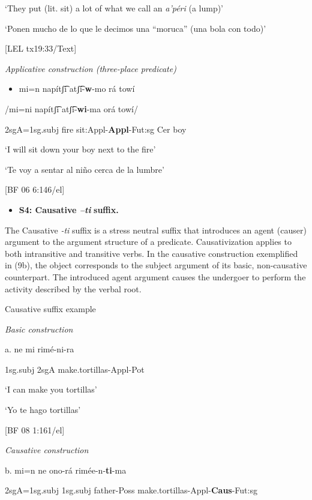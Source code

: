     ‘They put (lit. sit) a lot of what we call an \textit{a’péri}  (a lump)’

‘Ponen mucho de lo que le decimos una “moruca” (una bola con todo)’

  [LEL tx19:33/Text]

  \textit{Applicative construction (three-place predicate)}


\begin{itemize}
\item    mi=n     napítʃ͡i   atʃ͡í-\textbf{w}{}-mo     rá   towí
\end{itemize}

/mi=ni    napítʃ͡i   atʃ͡í-\textbf{wi}{}-ma    orá  towí/

2sgA=1sg.subj  fire  sit:Appl-\textbf{Appl}{}-Fut:sg  Cer  boy

‘I will sit down your boy next to the fire’

‘Te voy a sentar al niño cerca de la lumbre’    

[BF 06 6:146/el]


\begin{itemize}
\item \textbf{S4: Causative \textit{–ti} }\textbf{suffix.}
\end{itemize}

The Causative \textit{{}-ti} suffix is a stress neutral suffix that introduces an agent (causer) argument to the argument structure of a predicate. Causativization applies to both intransitive and transitive verbs. In the causative construction exemplified in (9b), the object corresponds to the subject argument of its basic, non-causative counterpart. The introduced agent argument causes the undergoer to perform the activity described by the verbal root.

   Causative suffix example

  \textit{Basic construction}

a.   ne  mi  rimé-ni-ra

 1sg.subj  2sgA  make.tortillas-Appl-Pot 

  ‘I can make you tortillas’

  ‘Yo te hago tortillas’          

  [BF 08 1:161/el]

  \textit{Causative construction}

b.  mi=n    ne   ono-rá    rimée-n-\textbf{ti}{}-ma

2sgA=1sg.subj  1sg.subj  father-Poss  make.tortillas-Appl-\textbf{Caus}{}-Fut:sg 

